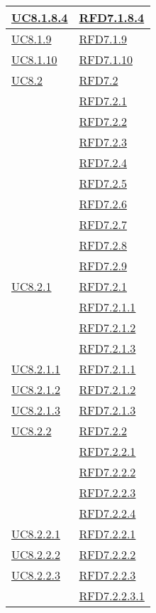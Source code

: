 \begin{longtable}{|>{\centering}m{5cm}|m{5cm}<{\centering}|}
\hyperref[UC8.1.8.4]{UC8.1.8.4} & \hyperlink{RFD7.1.8.4}{RFD7.1.8.4}\\ \hline
\hyperref[UC8.1.9]{UC8.1.9} & \hyperlink{RFD7.1.9}{RFD7.1.9}\\ \hline
\hyperref[UC8.1.10]{UC8.1.10} & \hyperlink{RFD7.1.10}{RFD7.1.10}\\ \hline
\hyperref[UC8.2]{UC8.2} & \hyperlink{RFD7.2}{RFD7.2}\\
& \hyperlink{RFD7.2.1}{RFD7.2.1}\\
& \hyperlink{RFD7.2.2}{RFD7.2.2}\\
& \hyperlink{RFD7.2.3}{RFD7.2.3}\\
& \hyperlink{RFD7.2.4}{RFD7.2.4}\\
& \hyperlink{RFD7.2.5}{RFD7.2.5}\\
& \hyperlink{RFD7.2.6}{RFD7.2.6}\\
& \hyperlink{RFD7.2.7}{RFD7.2.7}\\
& \hyperlink{RFD7.2.8}{RFD7.2.8}\\
& \hyperlink{RFD7.2.9}{RFD7.2.9}\\ \hline
\hyperref[UC8.2.1]{UC8.2.1} & \hyperlink{RFD7.2.1}{RFD7.2.1}\\
& \hyperlink{RFD7.2.1.1}{RFD7.2.1.1}\\
& \hyperlink{RFD7.2.1.2}{RFD7.2.1.2}\\
& \hyperlink{RFD7.2.1.3}{RFD7.2.1.3}\\ \hline
\hyperref[UC8.2.1.1]{UC8.2.1.1} & \hyperlink{RFD7.2.1.1}{RFD7.2.1.1}\\ \hline
\hyperref[UC8.2.1.2]{UC8.2.1.2} & \hyperlink{RFD7.2.1.2}{RFD7.2.1.2}\\ \hline
\hyperref[UC8.2.1.3]{UC8.2.1.3} & \hyperlink{RFD7.2.1.3}{RFD7.2.1.3}\\ \hline
\hyperref[UC8.2.2]{UC8.2.2} & \hyperlink{RFD7.2.2}{RFD7.2.2}\\
& \hyperlink{RFD7.2.2.1}{RFD7.2.2.1}\\
& \hyperlink{RFD7.2.2.2}{RFD7.2.2.2}\\
& \hyperlink{RFD7.2.2.3}{RFD7.2.2.3}\\
& \hyperlink{RFD7.2.2.4}{RFD7.2.2.4}\\ \hline
\hyperref[UC8.2.2.1]{UC8.2.2.1} & \hyperlink{RFD7.2.2.1}{RFD7.2.2.1}\\ \hline
\hyperref[UC8.2.2.2]{UC8.2.2.2} & \hyperlink{RFD7.2.2.2}{RFD7.2.2.2}\\ \hline
\hyperref[UC8.2.2.3]{UC8.2.2.3} & \hyperlink{RFD7.2.2.3}{RFD7.2.2.3}\\
& \hyperlink{RFD7.2.2.3.1}{RFD7.2.2.3.1}\\

\end{longtable}
